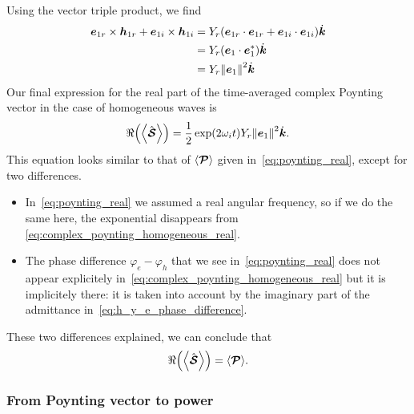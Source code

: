 Using the vector triple product, we find
\begin{subequations}
\begin{align}
    \vect{e}_{1\re} \times \vect{h}_{1\re}
    +
    \vect{e}_{1\im} \times \vect{h}_{1\im}
    &=
    Y_\re (\vect{e}_{1\re} \cdot \vect{e}_{1\re} +
         \vect{e}_{1\im} \cdot \vect{e}_{1\im}) \vectu{k}
    \\
    &=
    Y_\re (\vect{e}_1 \cdot \vect{e}_1^*) \vectu{k}
    \\
    &=
    Y_\re \norm{\vect{e}_1}^2 \vectu{k}
\end{align}
\end{subequations}
Our final expression for the real part of the time-averaged complex Poynting vector in the case of homogeneous waves is
\begin{equation}
    \Re\left( \Timeavg{\vectcp{\power{S}}} \right)
    =
    \frac{1}{2}
    \exp(2\omega_\im t)
    Y_\re %
    \norm{\vect{e}_1}^2
    \vectu{k}
    \text{.}
    \label{eq:complex_poynting_homogeneous_real}
\end{equation}
This equation looks similar to that of $\langle \bm{\mathcal{P}} \rangle$ given in~\cref{eq:poynting_real}, except for two differences.
\begin{itemize}
    \item 
In~\cref{eq:poynting_real} we assumed a real angular frequency, so if we do the same here, the exponential disappears from \cref{eq:complex_poynting_homogeneous_real}.
    \item
The phase difference $\varphi_e-\varphi_h$ that we see in~\cref{eq:poynting_real} does not appear explicitely in~\cref{eq:complex_poynting_homogeneous_real} but it is implicitely there:
it is taken into account by the imaginary part of the admittance in~\cref{eq:h_y_e_phase_difference}.
\end{itemize}
These two differences explained, we can conclude that
\begin{equation}
    \Re\left( \Timeavg{\vectcp{\power{S}}} \right) = \timeavg{\vect{\power{P}}}
    \text{.}
\end{equation}



\subsubsection{From Poynting vector to power}

